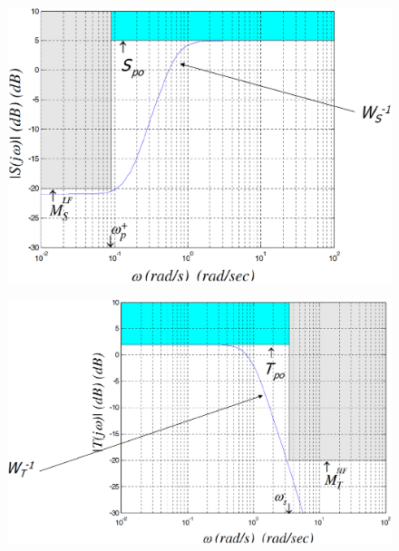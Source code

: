 \documentclass{article}
\numberwithin{equation}{subsection}
\begin{document}
	\begin{figure}[htbp]
		\centering
		\begin{minipage}{0.45\textwidth} %
			\centering
			\includegraphics[width=\linewidth]{images/Approximation_W_S.png} %
			\label{fig:image1}
		\end{minipage}
		\hfill %
		\vrule width 0.5pt %
		\hfill %
		\begin{minipage}{0.45\textwidth} %
			\centering
			\vspace{0pt}
			\includegraphics[width=1.135\linewidth]{images/Approximation_W_T.png} %
			\label{fig:image2}
		\end{minipage}
	\end{figure}
	
\end{document}
